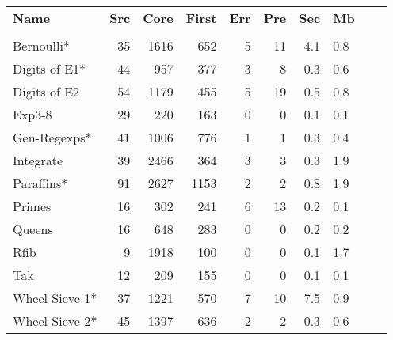 \begin{table}
\begin{tabular*}{\linewidth}{lrrrrrrlll}
\hspace{-2mm} \textbf{Name} & \textbf{Src} & \textbf{Core} & \textbf{First} & \textbf{Err} & \textbf{Pre} & \textbf{Sec} & \textbf{Mb} \\
\vspace{-1ex} \\
\hspace{-2mm} Bernoulli*                   & 35 & 1616 &  652 & 5 & 11 & 4.1 & 0.8 \\
\hspace{-2mm} Digits of E1*  \hspace{-3mm} & 44 &  957 &  377 & 3 &  8 & 0.3 & 0.6 \\
\hspace{-2mm} Digits of E2   \hspace{-3mm} & 54 & 1179 &  455 & 5 & 19 & 0.5 & 0.8 \\
\hspace{-2mm} Exp3-8                       & 29 &  220 &  163 & 0 &  0 & 0.1 & 0.1 \\
\hspace{-2mm} Gen-Regexps*   \hspace{-3mm} & 41 & 1006 &  776 & 1 &  1 & 0.3 & 0.4 \\
\hspace{-2mm} Integrate                    & 39 & 2466 &  364 & 3 &  3 & 0.3 & 1.9 \\
\hspace{-2mm} Paraffins*                   & 91 & 2627 & 1153 & 2 &  2 & 0.8 & 1.9 \\
\hspace{-2mm} Primes                       & 16 &  302 &  241 & 6 & 13 & 0.2 & 0.1 \\
\hspace{-2mm} Queens                       & 16 &  648 &  283 & 0 &  0 & 0.2 & 0.2 \\
\hspace{-2mm} Rfib                         &  9 & 1918 &  100 & 0 &  0 & 0.1 & 1.7 \\
\hspace{-2mm} Tak                          & 12 &  209 &  155 & 0 &  0 & 0.1 & 0.1 \\
\hspace{-2mm} Wheel Sieve 1* \hspace{-3mm} & 37 & 1221 &  570 & 7 & 10 & 7.5 & 0.9 \\
\hspace{-2mm} Wheel Sieve 2* \hspace{-3mm} & 45 & 1397 &  636 & 2 &  2 & 0.3 & 0.6 \\

\end{tabular*}
\end{table}
